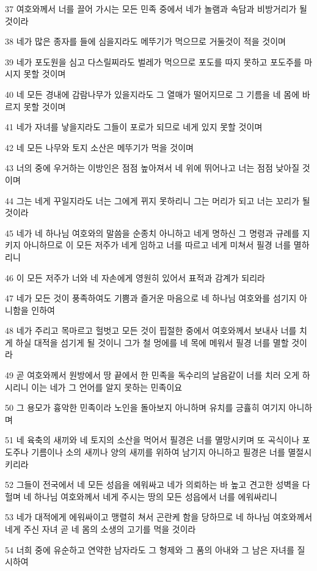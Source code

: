 \par 37 여호와께서 너를 끌어 가시는 모든 민족 중에서 네가 놀램과 속담과 비방거리가 될 것이라
\par 38 네가 많은 종자를 들에 심을지라도 메뚜기가 먹으므로 거둘것이 적을 것이며
\par 39 네가 포도원을 심고 다스릴찌라도 벌레가 먹으므로 포도를 따지 못하고 포도주를 마시지 못할 것이며
\par 40 네 모든 경내에 감람나무가 있을지라도 그 열매가 떨어지므로 그 기름을 네 몸에 바르지 못할 것이며
\par 41 네가 자녀를 낳을지라도 그들이 포로가 되므로 네게 있지 못할 것이며
\par 42 네 모든 나무와 토지 소산은 메뚜기가 먹을 것이며
\par 43 너의 중에 우거하는 이방인은 점점 높아져서 네 위에 뛰어나고 너는 점점 낮아질 것이며
\par 44 그는 네게 꾸일지라도 너는 그에게 뀌지 못하리니 그는 머리가 되고 너는 꼬리가 될 것이라
\par 45 네가 네 하나님 여호와의 말씀을 순종치 아니하고 네게 명하신 그 명령과 규례를 지키지 아니하므로 이 모든 저주가 네게 임하고 너를 따르고 네게 미쳐서 필경 너를 멸하리니
\par 46 이 모든 저주가 너와 네 자손에게 영원히 있어서 표적과 감계가 되리라
\par 47 네가 모든 것이 풍족하여도 기쁨과 즐거운 마음으로 네 하나님 여호와를 섬기지 아니함을 인하여
\par 48 네가 주리고 목마르고 헐벗고 모든 것이 핍절한 중에서 여호와께서 보내사 너를 치게 하실 대적을 섬기게 될 것이니 그가 철 멍에를 네 목에 메워서 필경 너를 멸할 것이라
\par 49 곧 여호와께서 원방에서 땅 끝에서 한 민족을 독수리의 날음같이 너를 치러 오게 하시리니 이는 네가 그 언어를 알지 못하는 민족이요
\par 50 그 용모가 흉악한 민족이라 노인을 돌아보지 아니하며 유치를 긍휼히 여기지 아니하며
\par 51 네 육축의 새끼와 네 토지의 소산을 먹어서 필경은 너를 멸망시키며 또 곡식이나 포도주나 기름이나 소의 새끼나 양의 새끼를 위하여 남기지 아니하고 필경은 너를 멸절시키리라
\par 52 그들이 전국에서 네 모든 성읍을 에워싸고 네가 의뢰하는 바 높고 견고한 성벽을 다 헐며 네 하나님 여호와께서 네게 주시는 땅의 모든 성읍에서 너를 에워싸리니
\par 53 네가 대적에게 에워싸이고 맹렬히 쳐서 곤란케 함을 당하므로 네 하나님 여호와께서 네게 주신 자녀 곧 네 몸의 소생의 고기를 먹을 것이라
\par 54 너희 중에 유순하고 연약한 남자라도 그 형제와 그 품의 아내와 그 남은 자녀를 질시하여
